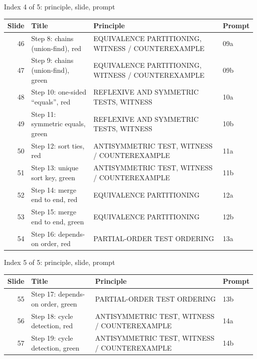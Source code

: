 \begin{frame}{Index 4 of 5: principle, slide, prompt}
\scriptsize
\begin{tabular}{@{}r>{\raggedright\arraybackslash}p{5.4cm}>{\raggedright\arraybackslash}p{4.6cm}p{1.2cm}@{}}
\textbf{Slide} & \textbf{Title} & \textbf{Principle} & \textbf{Prompt}\\\midrule
46 & Step 8: chains (union-find), red & EQUIVALENCE PARTITIONING, WITNESS / COUNTEREXAMPLE & 09a\\
47 & Step 9: chains (union-find), green & EQUIVALENCE PARTITIONING, WITNESS / COUNTEREXAMPLE & 09b\\
48 & Step 10: one-sided ``equals'', red & REFLEXIVE AND SYMMETRIC TESTS, WITNESS & 10a\\
49 & Step 11: symmetric equals, green & REFLEXIVE AND SYMMETRIC TESTS, WITNESS & 10b\\
50 & Step 12: sort ties, red & ANTISYMMETRIC TEST, WITNESS / COUNTEREXAMPLE & 11a\\
51 & Step 13: unique sort key, green & ANTISYMMETRIC TEST, WITNESS / COUNTEREXAMPLE & 11b\\
52 & Step 14: merge end to end, red & EQUIVALENCE PARTITIONING & 12a\\
53 & Step 15: merge end to end, green & EQUIVALENCE PARTITIONING & 12b\\
54 & Step 16: depends-on order, red & PARTIAL-ORDER TEST ORDERING & 13a\\
\end{tabular}
\end{frame}
\begin{frame}{Index 5 of 5: principle, slide, prompt}
\scriptsize
\begin{tabular}{@{}r>{\raggedright\arraybackslash}p{5.4cm}>{\raggedright\arraybackslash}p{4.6cm}p{1.2cm}@{}}
\textbf{Slide} & \textbf{Title} & \textbf{Principle} & \textbf{Prompt}\\\midrule
55 & Step 17: depends-on order, green & PARTIAL-ORDER TEST ORDERING & 13b\\
56 & Step 18: cycle detection, red & ANTISYMMETRIC TEST, WITNESS / COUNTEREXAMPLE & 14a\\
57 & Step 19: cycle detection, green & ANTISYMMETRIC TEST, WITNESS / COUNTEREXAMPLE & 14b\\
\end{tabular}
\end{frame}
